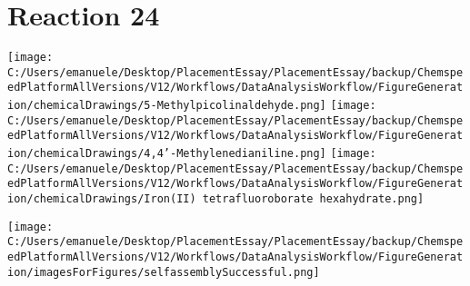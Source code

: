 \documentclass{article}%
\begin{document}
\section*{Reaction 24}%
%
\begin{scheme}[H]%
\begin{minipage}{0.5\textwidth}%
\texttt{[image: C:/Users/emanuele/Desktop/PlacementEssay/PlacementEssay/backup/ChemspeedPlatformAllVersions/V12/Workflows/DataAnalysisWorkflow/FigureGeneration/chemicalDrawings/5-Methylpicolinaldehyde.png]}%
\texttt{[image: C:/Users/emanuele/Desktop/PlacementEssay/PlacementEssay/backup/ChemspeedPlatformAllVersions/V12/Workflows/DataAnalysisWorkflow/FigureGeneration/chemicalDrawings/4,4'-Methylenedianiline.png]}%
\texttt{[image: C:/Users/emanuele/Desktop/PlacementEssay/PlacementEssay/backup/ChemspeedPlatformAllVersions/V12/Workflows/DataAnalysisWorkflow/FigureGeneration/chemicalDrawings/Iron(II) tetrafluoroborate hexahydrate.png]}%
\end{minipage}%
\begin{minipage}{0.5\textwidth}%
\begin{center}%
\texttt{[image: C:/Users/emanuele/Desktop/PlacementEssay/PlacementEssay/backup/ChemspeedPlatformAllVersions/V12/Workflows/DataAnalysisWorkflow/FigureGeneration/imagesForFigures/selfassemblySuccessful.png]}%
\end{center}%
\end{minipage}%
\caption{Self-assembly of components 3, 17, with Iron(II) in a 3.0:1.5:1.0 molar ratio in CH$_3$CN at 60\textdegree C for 40h. These are the reagents (starting materials) for reaction 24.}%
\end{scheme}%
\end{document}
